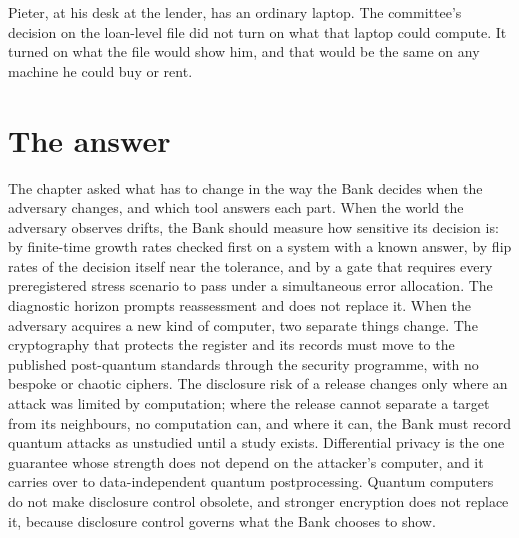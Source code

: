 Pieter, at his desk at the lender, has an ordinary laptop. The committee's decision on the
loan-level file did not turn on what that laptop could compute. It turned on what the file would
show him, and that would be the same on any machine he could buy or rent.

\section{The answer}

The chapter asked what has to change in the way the Bank decides when the adversary changes, and
which tool answers each part. When the world the adversary observes drifts, the Bank should measure
how sensitive its decision is: by finite-time growth rates checked first on a system with a known
answer, by flip rates of the decision itself near the tolerance, and by a gate that requires every
preregistered stress scenario to pass under a simultaneous error allocation. The diagnostic
horizon prompts reassessment and does not replace it. When the adversary acquires a new kind of
computer, two separate things change. The cryptography that protects the register and its records
must move to the published post-quantum standards through the security programme, with no bespoke
or chaotic ciphers. The disclosure risk of a release changes only where an attack was limited by
computation; where the release cannot separate a target from its neighbours, no computation can,
and where it can, the Bank must record quantum attacks as unstudied until a study exists.
Differential privacy is the one guarantee whose strength does not depend on the attacker's
computer, and it carries over to data-independent quantum postprocessing. Quantum computers do not
make disclosure control obsolete, and stronger encryption does not replace it, because disclosure
control governs what the Bank chooses to show.

